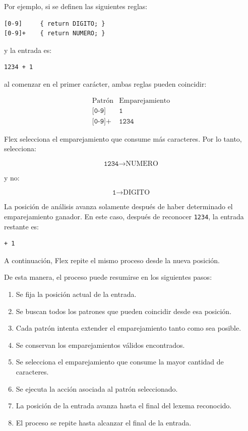 \documentclass{article}
\begin{document}
Por ejemplo, si se definen las siguientes reglas:

\begin{verbatim}
[0-9]     { return DIGITO; }
[0-9]+    { return NUMERO; }
\end{verbatim}

y la entrada es:

\begin{verbatim}
1234 + 1
\end{verbatim}

al comenzar en el primer carácter, ambas reglas pueden coincidir:

\[
\begin{array}{c|c}
\text{Patrón} & \text{Emparejamiento} \\
\hline
\texttt{[0-9]} & \texttt{1} \\
\texttt{[0-9]+} & \texttt{1234}
\end{array}
\]

Flex selecciona el emparejamiento que consume más caracteres. Por lo
tanto, selecciona:

\[
\texttt{1234} \longrightarrow \text{NUMERO}
\]

y no:

\[
\texttt{1} \longrightarrow \text{DIGITO}
\]

La posición de análisis avanza solamente después de haber determinado
el emparejamiento ganador. En este caso, después de reconocer
\texttt{1234}, la entrada restante es:

\begin{verbatim}
+ 1
\end{verbatim}

A continuación, Flex repite el mismo proceso desde la nueva posición.

De esta manera, el proceso puede resumirse en los siguientes pasos:

\begin{enumerate}
\item Se fija la posición actual de la entrada.
\item Se buscan todos los patrones que pueden coincidir desde esa
posición.
\item Cada patrón intenta extender el emparejamiento tanto como sea
posible.
\item Se conservan los emparejamientos válidos encontrados.
\item Se selecciona el emparejamiento que consume la mayor cantidad
de caracteres.
\item Se ejecuta la acción asociada al patrón seleccionado.
\item La posición de la entrada avanza hasta el final del lexema
reconocido.
\item El proceso se repite hasta alcanzar el final de la entrada.
\end{enumerate}
\end{document}
